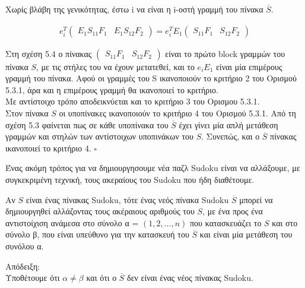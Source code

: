 \documentclass[oneside,12pt]{book}
\theoremstyle{definition}
\begin{document}
Χωρίς βλάβη της γενικότητας, έστω i να είναι η i-οστή γραμμή του πίνακα \(\overline{S}\).

\begin{align}
	e_{i}^{T} \begin{pmatrix}
				E_{1}S_{11}F_{1} & E_{1}S_{12}F_{2}
			\end{pmatrix} =
	e_{i}^{T}E_{1} \begin{pmatrix}
	S_{11}F_{1} & S_{12}F_{2}
	\end{pmatrix}
\end{align}

Στη σχέση 5.4 ο πίνακας \(\begin{pmatrix}
								S_{11}F_{1} & S_{12}F_{2}
						\end{pmatrix}\)
είναι το πρώτο block γραμμών του πίνακα \(S\), με τις στήλες του να έχουν μετατεθεί, και το \(e_{i}E_{1}\) είναι μία επιμέρους γραμμή του πίνακα. Αφού οι γραμμές του S ικανοποιούν το κριτήριο 2 του Ορισμού 5.3.1, άρα και η επιμέρους γραμμή θα ικανοποιεί το κριτήριο. \\

Με αντίστοιχο τρόπο αποδεικνύεται και το κριτήριο 3 του Ορισμου 5.3.1. \\

Στον πίνακα \(S\) οι υποπίνακες ικανοποιούν το κριτήριο 4 του Ορισμού 5.3.1. Από τη σχέση 5.3 φαίνεται πως σε κάθε υποπίνακα του \(\overline{S}\) έχει γίνει μία απλή μετάθεση γραμμών και στηλών των αντίστοιχων υποπινάκων του \(S\). Συνεπώς, και ο \(\overline{S}\) πίνακας ικανοποιεί το κριτήριο 4. \(\square\)

Ένας ακόμη τρόπος για να δημιουργησουμε νέα παζλ Sudoku είναι να αλλάξουμε, με συγκεκριμένη τεχνική, τους ακεραίους του Sudoku που ήδη διαθέτουμε. \par

\begin{theorem}{}{}
	Αν \(S\) είναι ένας πίνακας Sudoku, τότε ένας νεός πίνακα Sudoku \(\overline{S}\) μπορεί να δημιουργηθεί αλλάζοντας τους ακέραιους αριθμούς του \(S\), με ένα προς ένα αντιστοίχιση ανάμεσα στο σύνολο α = \(\left( 1,2,\dots,n\right)\) που κατασκευάζει το \(S\) και στο σύνολο β, που είναι υπεύθυνο για την κατασκευή του \(\overline{S}\) και είναι μία μετάθεση του συνόλου α.
\end{theorem}

Απόδειξη: \\
Υποθέτουμε ότι \(α \neq β\) και ότι ο \(\overline{S}\) δεν είναι ένας νέος πίνακας Sudoku. \\
\end{document}
